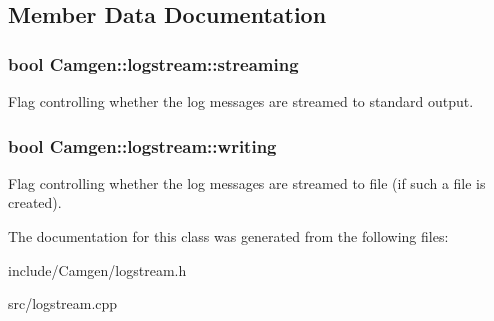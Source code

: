 \subsection{Member Data Documentation}
\hypertarget{a00326_a27e6b54cae2e0c36403e0002bbcd1b2c}{
\subsubsection[{streaming}]{\setlength{\rightskip}{0pt plus 5cm}bool Camgen\-::logstream\-::streaming}}\label{a00326_a27e6b54cae2e0c36403e0002bbcd1b2c}


Flag controlling whether the log messages are streamed to standard output. 

\hypertarget{a00326_a6731cdd504121f6565943c9875ab6814}{
\subsubsection[{writing}]{\setlength{\rightskip}{0pt plus 5cm}bool Camgen\-::logstream\-::writing}}\label{a00326_a6731cdd504121f6565943c9875ab6814}


Flag controlling whether the log messages are streamed to file (if such a file is created). 



The documentation for this class was generated from the following files\-:\begin{DoxyCompactItemize}
\item 
include/\-Camgen/logstream.\-h\item 
src/logstream.\-cpp\end{DoxyCompactItemize}
